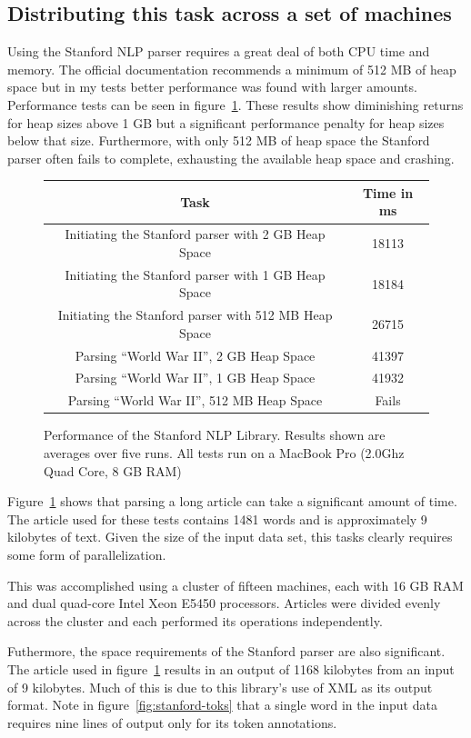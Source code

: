 \subsection{Distributing this task across a set of machines}

Using the Stanford NLP parser requires a great deal of both CPU time and memory.  The official documentation recommends a minimum of 512 MB of heap space but in my tests better performance was found with larger amounts.  Performance tests can be seen in figure~\ref{fig:stanford-perf}.  These results show diminishing returns for heap sizes above 1 GB but a significant performance penalty for heap sizes below that size.  Furthermore, with only 512 MB of heap space the Stanford parser often fails to complete, exhausting the available heap space and crashing.

\begin{figure}
\begin{tabular}{|c|c|}
\hline
Task & Time in ms \\
\hline
\hline
Initiating the Stanford parser with 2 GB Heap Space & 18113\\
Initiating the Stanford parser with 1 GB Heap Space & 18184\\
Initiating the Stanford parser with 512 MB Heap Space & 26715\\
Parsing ``World War II'', 2 GB Heap Space & 41397 \\
Parsing ``World War II'', 1 GB Heap Space & 41932 \\
Parsing ``World War II'', 512 MB Heap Space & Fails \\
\hline
\end{tabular}
\caption{Performance of the Stanford NLP Library.  Results shown are averages over five runs.  All tests run on a MacBook Pro (2.0Ghz Quad Core, 8 GB RAM)}
\label{fig:stanford-perf}
\end{figure}

Figure~\ref{fig:stanford-perf} shows that parsing a long article can take a significant amount of time.  The article used for these tests contains 1481 words and is approximately 9 kilobytes of text.  Given the size of the input data set, this tasks clearly requires some form of parallelization.

This was accomplished using a cluster of fifteen machines, each with 16 GB RAM and dual quad-core Intel Xeon E5450 processors.  Articles were divided evenly across the cluster and each performed its operations independently.  

Futhermore, the space requirements of the Stanford parser are also significant.  The article used in figure~\ref{fig:stanford-perf} results in an output of 1168 kilobytes from an input of 9 kilobytes.  Much of this is due to this library's use of XML as its output format.  Note in figure~\ref{fig:stanford-toks} that a single word in the input data requires nine lines of output only for its token annotations.  


